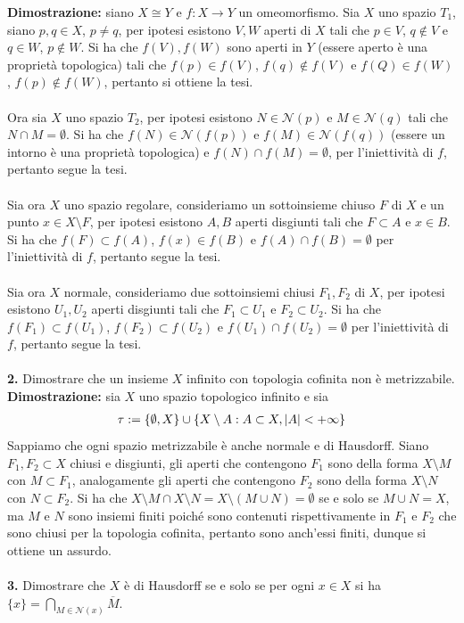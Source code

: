 \documentclass{article}
\begin{document}
\textbf{Dimostrazione:} siano $X \cong Y$ e $f : X \longrightarrow Y$ un omeomorfismo. Sia $X$ uno spazio $T_1$, siano $p, q \in X$, $p \neq q$, per ipotesi esistono $V, W$ aperti di $X$ tali che $p \in V$, $q \not\in V$ e $q \in W$, $p \not\in W$. Si ha che $f(V), f(W)$ sono aperti in $Y$ (essere aperto è una proprietà topologica) tali che $f(p) \in f(V)$, $f(q) \not\in f(V)$ e $f(Q) \in f(W)$, $f(p) \not\in f(W)$, pertanto si ottiene la tesi. \\ \\
Ora sia $X$ uno spazio $T_2$, per ipotesi esistono $N \in \mathcal{N}(p)$ e $M \in \mathcal{N}(q)$ tali che $N \cap M = \emptyset$. Si ha che $f(N) \in \mathcal{N}(f(p))$ e $f(M) \in \mathcal{N}(f(q))$ (essere un intorno è una proprietà topologica) e $f(N) \cap f(M) = \emptyset$, per l'iniettività di $f$, pertanto segue la tesi. \\ \\
Sia ora $X$ uno spazio regolare, consideriamo un sottoinsieme chiuso $F$ di $X$ e un punto $x \in X \setminus F$, per ipotesi esistono $A, B$ aperti disgiunti tali che $F \subset A$ e $x \in B$. Si ha che $f(F) \subset f(A)$, $f(x) \in f(B)$ e $f(A) \cap f(B) = \emptyset$ per l'iniettività di $f$, pertanto segue la tesi. \\ \\
Sia ora $X$ normale, consideriamo due sottoinsiemi chiusi $F_1, F_2$ di $X$, per ipotesi esistono $U_1, U_2$ aperti disgiunti tali che $F_1 \subset U_1$ e $F_2 \subset U_2$. Si ha che $f(F_1) \subset f(U_1)$, $f(F_2) \subset f(U_2)$ e $f(U_1) \cap f(U_2) = \emptyset$ per l'iniettività di $f$, pertanto segue la tesi. \\ \\
\textbf{2.} Dimostrare che un insieme $X$ infinito con topologia cofinita non è metrizzabile. \\

\textbf{Dimostrazione:} sia $X$ uno spazio topologico infinito e sia 
\begin{gather}
    \tau := \{ \emptyset, X \} \cup \{ X \setminus A : A \subset X, |A| < +\infty \} \notag
\end{gather}
Sappiamo che ogni spazio metrizzabile è anche normale e di Hausdorff. Siano $F_1, F_2 \subset X$ chiusi e disgiunti, gli aperti che contengono $F_1$ sono della forma $X \setminus M$ con $M \subset F_1$, analogamente gli aperti che contengono $F_2$ sono della forma $X \setminus N$ con $N \subset F_2$. Si ha che $X \setminus M \cap X \setminus N = X \setminus (M \cup N) = \emptyset$ se e solo se $M \cup N = X$, ma $M$ e $N$ sono insiemi finiti poiché sono contenuti rispettivamente in $F_1$ e $F_2$ che sono chiusi per la topologia cofinita, pertanto sono anch'essi finiti, dunque si ottiene un assurdo. \\ \\
\textbf{3.} Dimostrare che $X$ è di Hausdorff se e solo se per ogni $x \in X$ si ha $\{ x \} = \bigcap_{M \in \mathcal{N}(x)} \overline{M}$. \\
\end{document}
